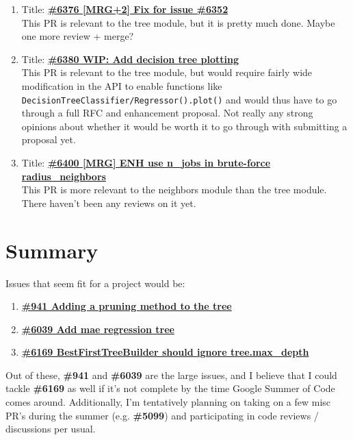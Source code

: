 \documentclass[12pt, oneside]{article}
\begin{document}
\begin{enumerate}
  \item
  Title:
  \textbf{\href{https://github.com/scikit-learn/scikit-learn/pull/6376}
    {\#6376 [MRG+2] Fix for issue \#6352}}\\
  This PR is relevant to the tree module, but it is pretty much
  done. Maybe one more review + merge?

  \item
  Title:
  \textbf{\href{https://github.com/scikit-learn/scikit-learn/pull/6380}
    {\#6380 WIP: Add decision tree plotting}}\\
  This PR is relevant to the tree module, but would require fairly
  wide modification in the API to enable functions like
  \texttt{DecisionTreeClassifier/Regressor().plot()} and would thus
  have to go through a full RFC and enhancement proposal. Not really
  any strong opinions about whether it would be worth it to go through
  with submitting a proposal yet.

  \item
  Title:
  \textbf{\href{https://github.com/scikit-learn/scikit-learn/pull/6400}
    {\#6400 [MRG] ENH use n\_jobs in brute-force radius\_neighbors}}\\
  This PR is more relevant to the neighbors module than the tree
  module. There haven't been any reviews on it yet.
\end{enumerate}

\section{Summary}
Issues that seem fit for a project would be:
\begin{enumerate}
  \item
  \textbf{\href{https://github.com/scikit-learn/scikit-learn/pull/941}
    {\#941 Adding a pruning method to the tree}}
  \item
  \textbf{\href{https://github.com/scikit-learn/scikit-learn/pull/6039}
    {\#6039 Add mae regression tree}}
  \item
  \textbf{\href{https://github.com/scikit-learn/scikit-learn/pull/6169}
    {\#6169 BestFirstTreeBuilder should ignore tree.max\_depth}}
\end{enumerate}
Out of these, \textbf{\#941} and \textbf{\#6039} are the large issues,
and I believe that I could tackle \textbf{\#6169} as well if it's not
complete by the time Google Summer of Code comes around. Additionally, I'm tentatively
planning on taking on a few misc PR's during the summer
(e.g. \textbf{\#5099}) and participating in code reviews / discussions
per usual.
\end{document}
